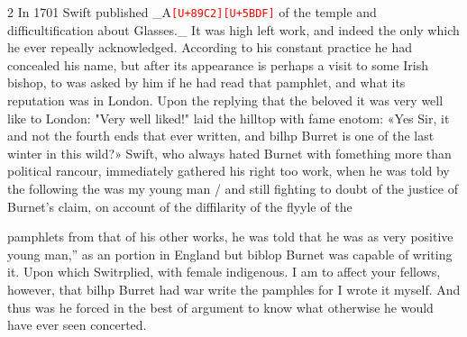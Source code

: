 \documentclass[10pt]{article}
\newcommand{\unk}[1]{\textcolor{red}{\texttt{\scriptsize[U+#1]}}}
\begin{document}
\begin{multicols}{2}
In 1701 Swift published \_A\unk{89C2}\unk{5BDF} of the temple and difficultification about Glasses.\_ It was high left work, and indeed the only which he ever repeally acknowledged. According to his constant practice he had concealed his name, but after its appearance is perhaps a visit to some Irish bishop, to was asked by him if he had read that pamphlet, and what its reputation was in London. Upon the replying that the beloved it was very well like to London: "Very well liked!" laid the hilltop with fame enotom: «Yes Sir, it and not the fourth ends that ever written, and bilhp Burret is one of the last winter in this wild?» Swift, who always hated Burnet with fomething more than political rancour, immediately gathered his right too work, when he was told by the following the was my young man / and still fighting to doubt of the justice of Burnet's claim, on account of the diffilarity of the flyyle of the

pamphlets from that of his other works, he was told that he was as very positive young man,” as an portion in England but biblop Burnet was capable of writing it. Upon which Switrplied, with female indigenous. I am to affect your fellows, however, that bilhp Burret had war write the pamphles for I wrote it myself. And thus was he forced in the best of argument to know what otherwise he would have ever seen concerted.


\end{multicols}
\end{document}
